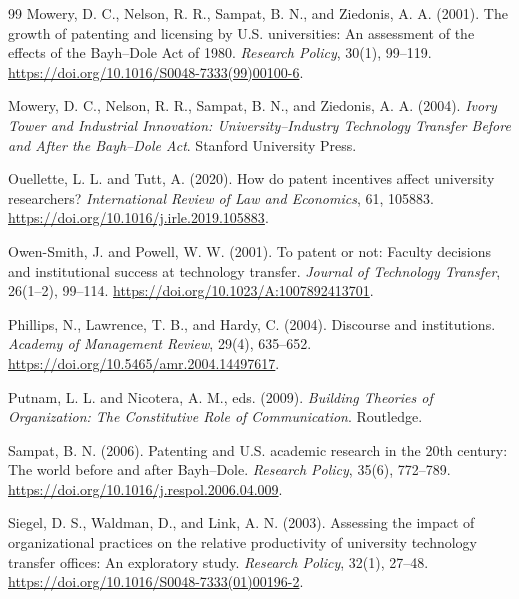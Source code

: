 \documentclass[12pt]{article}
\begin{document}
\begin{thebibliography}{99}
Mowery, D. C., Nelson, R. R., Sampat, B. N., and Ziedonis, A. A. (2001).
The growth of patenting and licensing by U.S. universities: An assessment of the effects of the Bayh--Dole Act of 1980.
\textit{Research Policy}, 30(1), 99--119.
\url{https://doi.org/10.1016/S0048-7333(99)00100-6}.

Mowery, D. C., Nelson, R. R., Sampat, B. N., and Ziedonis, A. A. (2004).
\textit{Ivory Tower and Industrial Innovation: University--Industry Technology Transfer Before and After the Bayh--Dole Act}.
Stanford University Press.

Ouellette, L. L. and Tutt, A. (2020).
How do patent incentives affect university researchers?
\textit{International Review of Law and Economics}, 61, 105883.
\url{https://doi.org/10.1016/j.irle.2019.105883}.

Owen-Smith, J. and Powell, W. W. (2001).
To patent or not: Faculty decisions and institutional success at technology transfer.
\textit{Journal of Technology Transfer}, 26(1--2), 99--114.
\url{https://doi.org/10.1023/A:1007892413701}.

Phillips, N., Lawrence, T. B., and Hardy, C. (2004).
Discourse and institutions.
\textit{Academy of Management Review}, 29(4), 635--652.
\url{https://doi.org/10.5465/amr.2004.14497617}.

Putnam, L. L. and Nicotera, A. M., eds. (2009).
\textit{Building Theories of Organization: The Constitutive Role of Communication}.
Routledge.

Sampat, B. N. (2006).
Patenting and U.S. academic research in the 20th century: The world before and after Bayh--Dole.
\textit{Research Policy}, 35(6), 772--789.
\url{https://doi.org/10.1016/j.respol.2006.04.009}.

Siegel, D. S., Waldman, D., and Link, A. N. (2003).
Assessing the impact of organizational practices on the relative productivity of university technology transfer offices: An exploratory study.
\textit{Research Policy}, 32(1), 27--48.
\url{https://doi.org/10.1016/S0048-7333(01)00196-2}.

\end{thebibliography}
\end{document}
